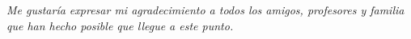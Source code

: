 
\pagestyle{empty}
\phantom{a}
\vfill
\begin{flushright}
\textit{%
%
Me gustaría expresar mi agradecimiento a todos los amigos, profesores y familia que han hecho posible que llegue a este punto.
%
}
\end{flushright}
\vfill
\restoregeometry

